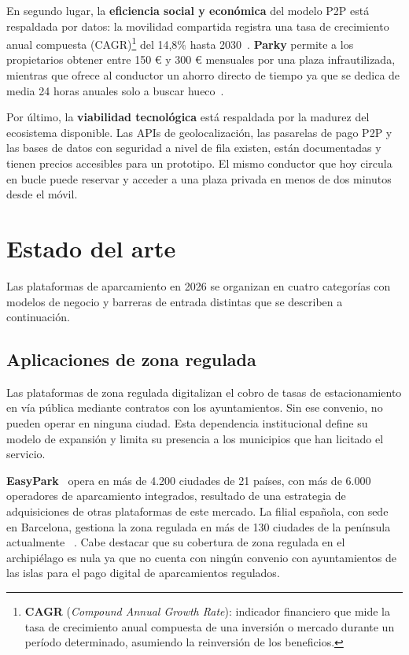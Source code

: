 En segundo lugar, la \textbf{eficiencia social y económica} del modelo P2P está respaldada por datos: la movilidad compartida registra una tasa de crecimiento anual compuesta (CAGR)\footnote{\textbf{CAGR} (\textit{Compound Annual Growth Rate}): indicador financiero que mide la tasa de crecimiento anual compuesta de una inversión o mercado durante un período determinado, asumiendo la reinversión de los beneficios.} del 14,8\% hasta 2030~\cite{grandviewresearch2022}. \textbf{Parky} permite a los propietarios obtener entre 150 € y 300 € mensuales por una plaza infrautilizada, mientras que ofrece al conductor un ahorro directo de tiempo ya que se dedica de media 24 horas anuales solo a buscar hueco~\cite{inrix2022}.

Por último, la \textbf{viabilidad tecnológica} está respaldada por la madurez del ecosistema disponible. Las APIs de geolocalización, las pasarelas de pago P2P y las bases de datos con seguridad a nivel de fila existen, están documentadas y tienen precios accesibles para un prototipo. El mismo conductor que hoy circula en bucle puede reservar y acceder a una plaza privada en menos de dos minutos desde el móvil.

\section{Estado del arte}
\label{sec:estado-del-arte}

Las plataformas de aparcamiento en 2026 se organizan en cuatro categorías con modelos de negocio y barreras de entrada distintas que se describen a continuación.

\subsection{Aplicaciones de zona regulada}

Las plataformas de zona regulada digitalizan el cobro de tasas de estacionamiento en vía pública mediante contratos con los ayuntamientos. Sin ese convenio, no pueden operar en ninguna ciudad. Esta dependencia institucional define su modelo de expansión y limita su presencia a los municipios que han licitado el servicio.

\textbf{EasyPark}~\cite{easypark2024} opera en más de 4.200 ciudades de 21 países, con más de 6.000 operadores de aparcamiento integrados, resultado de una estrategia de adquisiciones de otras plataformas de este mercado. La filial española, con sede en Barcelona, gestiona la zona regulada en más de 130 ciudades de la península actualmente ~\cite{lavanguardia2024easypark}. Cabe destacar que su cobertura de zona regulada en el archipiélago es nula ya que no cuenta con ningún convenio con ayuntamientos de las islas para el pago digital de aparcamientos regulados.


